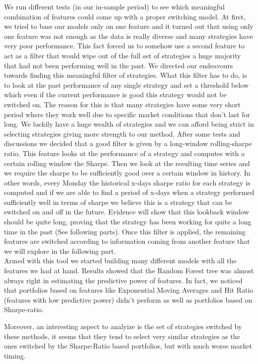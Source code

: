 \documentclass[12pt]{article} %
\numberwithin{equation}{subsection}
\begin{document}
We run different tests (in our in-sample period) to see which meaningful combination of features could come up with a proper switching model. At first, we tried to base our models only on one feature and it turned out that using only one feature was not enough as the data is really diverse and many strategies have very poor performance. This fact forced us to somehow use a second feature to act as a filter that would wipe out of the full set of strategies a huge majority that had not been performing well in the past. We directed our endeavours towards finding this meaningful filter of strategies. What this filter has to do, is to look at the past performance of any single strategy and set a threshold below which even if the current performance is good this strategy would not be switched on. The reason for this is that many strategies have some very short period where they work well due to specific market conditions that don't last for long. We luckily have a huge wealth of strategies and we can afford being strict in selecting strategies giving more strength to our method. After some tests and discussions we decided that a good filter is given by a long-window rolling-sharpe ratio. This feature looks at the performance of a strategy and computes with a certain rolling window the Sharpe. Then we look at the resulting time series and we require the sharpe to be sufficiently good over a certain window in history. In other words, every Monday the historical x-days sharpe ratio for each strategy is computed and if we are able to find  a period of x-days when a strategy performed sufficiently well in terms of sharpe we believe this is a strategy that can be switched on and off in the future. Evidence will show that this lookback window should be quite long, proving that the strategy has been working for quite a long time in the past (See following parts). Once this filter is applied, the remaining features are switched according to information coming from another feature that we will explore in the following part.\\
Armed with this tool we started building many different models with all the features we had at hand. Results showed that the Random Forest tree was almost always right in estimating the predictive power of features. In fact, we noticed that portfolios based on features like Exponential Moving Averages and Hit Ratio (features with low predictive power) didn't perform as well as portfolios based on Sharpe-ratio.

Moreover, an interesting aspect to analyize is the set of strategies switched by these methods, it seems that they tend to select very similar strategies as the ones switched by the Sharpe-Ratio based portfolios, but with much worse market timing.\\
\end{document}
